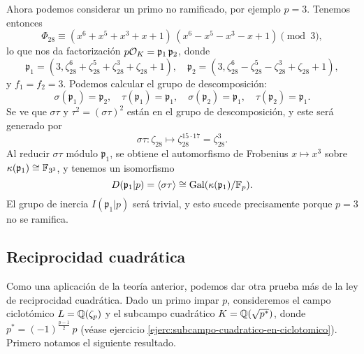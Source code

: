 \begin{ejemplo}
  Ahora podemos considerar un primo no ramificado, por ejemplo $p = 3$.
  Tenemos entonces
  $$\Phi_{28} \equiv (x^6 + x^5 + x^3 + x + 1)\,(x^6 - x^5 - x^3 - x + 1) \pmod{3},$$
  lo que nos da factorización $p\mathcal{O}_K = \mathfrak{p}_1\,\mathfrak{p}_2$, donde
  \[ \mathfrak{p}_1 = (3, \zeta_{28}^6 + \zeta_{28}^5 + \zeta_{28}^3 + \zeta_{28} + 1), \quad
     \mathfrak{p}_2 = (3, \zeta_{28}^6 - \zeta_{28}^5 - \zeta_{28}^3 + \zeta_{28} + 1), \]
  y
  $f_1 = f_2 = 3$. Podemos calcular el grupo de descomposición:
  \[ \sigma (\mathfrak{p}_1) = \mathfrak{p}_2, \quad
     \tau (\mathfrak{p}_1) = \mathfrak{p}_1, \quad
     \sigma (\mathfrak{p}_2) = \mathfrak{p}_1, \quad
     \tau (\mathfrak{p}_2) = \mathfrak{p}_1. \]
  Se ve que $\sigma\tau$ y $\tau^2 = (\sigma\tau)^2$ están en el grupo de
  descomposición, y este será generado por
  $$\sigma\tau\colon \zeta_{28} \mapsto \zeta_{28}^{15\cdot 17} = \zeta_{28}^3.$$
  Al reducir $\sigma\tau$ módulo $\mathfrak{p}_1$, se obtiene el automorfismo
  de Frobenius $x \mapsto x^3$ sobre $\kappa (\mathfrak{p}_1) \cong \mathbb{F}_{3^3}$,
  y tenemos un isomorfismo
  \[ D (\mathfrak{p}_1|p) = \langle\sigma\tau\rangle
     \cong \operatorname{Gal} (\kappa (\mathfrak{p}_1)/\mathbb{F}_p). \]
  El grupo de inercia $I (\mathfrak{p}_1|p)$ será trivial, y esto sucede
  precisamente porque $p = 3$ no se ramifica.
\end{ejemplo}

\subsection{Reciprocidad cuadrática}

Como una aplicación de la teoría anterior, podemos dar otra prueba más de
la ley de reciprocidad cuadrática. Dado un primo impar $p$, consideremos
el campo ciclotómico $L = \mathbb{Q} (\zeta_p)$ y el subcampo cuadrático
$K = \mathbb{Q} (\sqrt{p^*})$, donde $p^* = (-1)^{\frac{p-1}{2}}\,p$
(véase ejercicio \ref{ejerc:subcampo-cuadratico-en-ciclotomico}).
Primero notamos el siguiente resultado.

